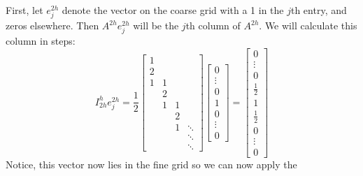 \documentclass[11pt]{article}
\begin{document}
First, let \(e_j^{2h}\) denote the vector on the coarse grid with a 1 in
the \(j\)th entry, and zeros elsewhere. Then \(A^{2h}e_j^{2h}\) will be
the \(j\)th column of \(A^{2h}\). We will calculate this column in
steps: \[
I_{2h}^{h}e_j^{2h} =
\frac{1}{2}
\begin{bmatrix}
  1 &   &   & \\
  2 &   &   & \\
  1 & 1 &   & \\
    & 2 &   & \\
    & 1 & 1 & \\
    &   & 2 & \\
    &   & 1 & \ddots \\
    &   &   & \ddots \\
    &   &   & \ddots
\end{bmatrix}
\begin{bmatrix}
  0 \\ \vdots \\ 0 \\ 1 \\ 0 \\ \vdots \\ 0
\end{bmatrix}
=
\begin{bmatrix}
  0 \\ \vdots \\ 0 \\ \frac{1}{2} \\ 1 \\ \frac{1}{2} \\ 0 \\ \vdots \\ 0
\end{bmatrix}
\] Notice, this vector now lies in the fine grid so we can now apply the
\end{document}
